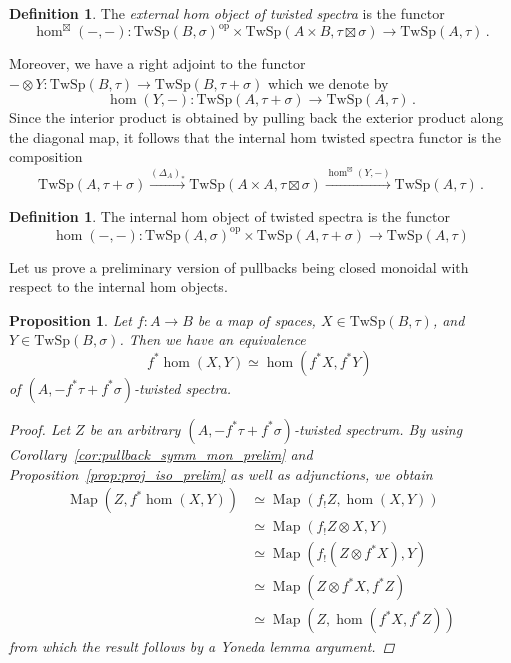 \documentclass[10pt]{amsart}
\newcommand{\longto}{\longrightarrow}
\theoremstyle{plain}
\newtheorem{proposition}[theorem]{Proposition}
\theoremstyle{definition}
\newtheorem{definition}[theorem]{Definition}
\DeclareMathOperator{\Map}{Map}
\newcommand{\oop}{\mathrm{op}}
\newcommand{\TwSp}{\mathrm{TwSp}}
\begin{document}
\begin{definition}
  The \emph{external hom object of twisted spectra} is the functor
  \[
  \hom^{\boxtimes}(-,-) : \TwSp(B,\sigma)^{\oop} \times \TwSp(A \times B , \tau \boxtimes \sigma) \longto \TwSp(A,\tau) \,.
  \]
\end{definition}

Moreover, we have a right adjoint to the functor $- \otimes Y : \TwSp(B,\tau) \to \TwSp(B,\tau + \sigma)$ which we denote by
\[
 \hom(Y,-) : \TwSp(A,\tau + \sigma) \longto \TwSp(A , \tau) \,.
\]
Since the interior product is obtained by pulling back the exterior product along the diagonal map, it follows that the internal hom twisted spectra functor is the composition
\[
\TwSp(A,\tau + \sigma) \overset{(\Delta_A)_*} \longto \TwSp(A \times A , \tau \boxtimes \sigma) \overset{\hom^{\boxtimes}(Y,-)}\longto \TwSp(A,\tau) \,.
\]

\begin{definition}
  The internal hom object of twisted spectra is the functor
  \[
  \hom(-,-) : \TwSp(A,\sigma)^{\oop} \times \TwSp(A , \tau + \sigma) \longto \TwSp(A,\tau)
  \]
\end{definition}

Let us prove a preliminary version of pullbacks being closed monoidal with respect to the internal hom objects.

\begin{proposition}
  Let $f : A \to B$ be a map of spaces, $X \in \TwSp(B,\tau)$, and $Y \in \TwSp(B,\sigma)$. Then we have an equivalence
  \[
  f^* \hom(X,Y) \simeq \hom(f^* X, f^* Y) \,
  \]
  of $(A,-f^* \tau + f^* \sigma)$-twisted spectra.
  \begin{proof}
    Let $Z$ be an arbitrary $(A,-f^* \tau + f^* \sigma)$-twisted spectrum.
    By using Corollary~\ref{cor:pullback_symm_mon_prelim} and Proposition~\ref{prop:proj_iso_prelim} as well as adjunctions, we obtain
    \begin{align*}
      \Map(Z,f^* \hom(X,Y)) &\simeq \Map(f_! Z , \hom(X,Y)) \\&\simeq \Map(f_! Z \otimes X , Y) \\ &\simeq \Map(f_!(Z \otimes f^* X),Y) \\ &\simeq \Map(Z \otimes f^* X , f^* Z) \\ &\simeq \Map(Z, \hom(f^* X , f^* Z))
    \end{align*}
    from which the result follows by a Yoneda lemma argument.
  \end{proof}
\end{proposition}
\end{document}
